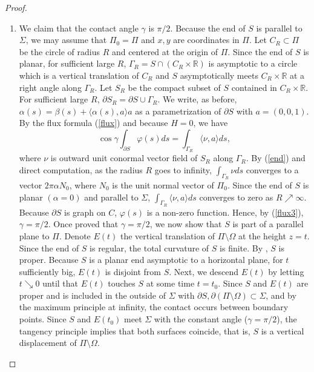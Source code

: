 \documentclass[12pt,a4paper]{amsart}
\begin{document}
\begin{proof}
\begin{enumerate}
\item We claim that the contact angle $\gamma$ is $\pi/2$. Because the end of $S$ is parallel to $\Sigma$, we may assume that $\Pi_0=\Pi$ and $x,y$ are coordinates in $\Pi$. Let $C_R\subset\Pi$ be the circle of radius $R$ and centered at the origin of $\Pi$. Since the end of $S$ is planar, for sufficient large $R$, $\Gamma_R=S\cap (C_R\times{\mathbb R})$ is asymptotic to a circle which is a vertical translation of $C_{R}$ and $S$ asymptotically meets $C_R\times{\mathbb R}$ at a right angle along $\Gamma_R$.
Let $S_R$ be the compact subset of $S$ contained in $C_R\times{\mathbb R}$. For sufficient large $R$, $\partial S_R=\partial S\cup\Gamma_R$. We write, as before, $\alpha(s)=\beta(s)+\langle\alpha(s),a\rangle a$ as a parametrization of $\partial S$ with $a=(0,0,1)$. By the flux formula (\ref{flux}) and because $H=0$, we have
\begin{equation}\label{flux3}
\cos\gamma\int_{\partial S}\varphi(s) ds=\int_{\Gamma_R}\langle \nu,a\rangle ds,
\end{equation}
where $\nu$ is outward unit conormal vector field of $S_{R}$ along $\Gamma_R$.
By (\ref{end}) and direct computation, as the radius $R$ goes to infinity, $\int_{\Gamma_R} \nu ds$ converges to a vector $2\pi\alpha N_0$, where $N_0$ is the unit normal vector of $\Pi_0$.
Since the end of $S$ is planar $(\alpha=0)$ and parallel to $\Sigma$, $\int_{\Gamma_R}\langle \nu,a\rangle ds$ converges to zero as $R\nearrow\infty$. Because $\partial S$ is graph on $C$, $\varphi(s)$ is a non-zero function. Hence, by (\ref{flux3}), $\gamma=\pi/2$.
Once proved that $\gamma=\pi/2$, we now show that $S$ is part of a parallel plane to $\Pi$. Denote $E(t)$ the vertical translation of $\Pi\setminus\Omega$ at the height $z=t$. Since the end of $S$ is regular, the total curvature of $S$ is finite. By \cite[Proposition 11.5]{fang}, $S$ is proper. Because $S$ is a planar end asymptotic to a horizontal plane, for $t$ sufficiently big, $E(t)$ is disjoint from $S$. Next, we descend $E(t)$ by letting $t\searrow 0$ until that $E(t)$ touches $S$ at some time $t=t_0$. Since $S$ and $E(t)$ are proper and is included in the outside of $\Sigma$ with $\partial S,\partial(\Pi\setminus\Omega)\subset\Sigma$, and by the maximum principle at infinity, the contact occurs between boundary points. Since $S$ and $E(t_0)$ meet $\Sigma$ with the constant angle ($\gamma=\pi/2$), the tangency principle implies that both surfaces coincide, that is, $S$ is a vertical displacement of $\Pi\setminus\Omega$.

\end{enumerate}
\end{proof}
\end{document}
